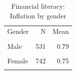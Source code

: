 \begin{table}[htbp]\centering\small
\caption{Financial literacy: Inflation by gender}
\label{tab:finlit_q2_by_gender}
\begin{tabular}{lrr}\toprule
Gender & N & Mean \\\\ \midrule
Male & 531 & 0.79 \\\\
Female & 742 & 0.75 \\\\
\bottomrule
\end{tabular}\end{table}

